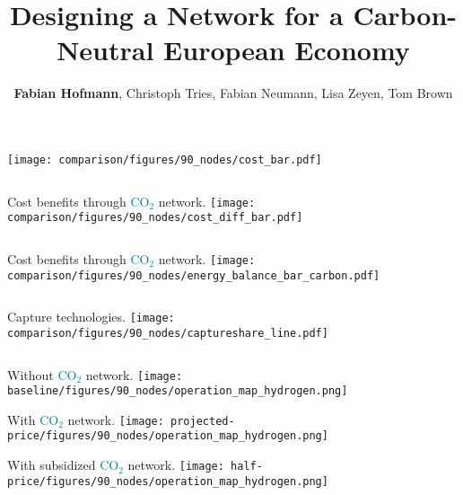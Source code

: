 \documentclass[12pt, aspectratio=169]{beamer}
\title{Designing a \carbon{} Network for a Carbon-Neutral European Economy}
\author{\textbf{Fabian Hofmann}, Christoph Tries, Fabian Neumann, Lisa Zeyen, Tom Brown}
\institute{Technical University Berlin}
\date{}
\newcommand{\carbon}{\textcolor{teal}{CO$_2$}}
\begin{document}
\begin{frame}[plain]
    \titlepage
\end{frame}


\begin{frame}
        \texttt{[image: comparison/figures/90\_nodes/cost\_bar.pdf]}
\end{frame}

\begin{frame}
    \begin{columns}
        Cost benefits through \carbon{} network.
        \texttt{[image: comparison/figures/90\_nodes/cost\_diff\_bar.pdf]}
    \end{columns}
\end{frame}


\begin{frame}
    \begin{columns}
        Cost benefits through \carbon{} network.
        \texttt{[image: comparison/figures/90\_nodes/energy\_balance\_bar\_carbon.pdf]}
    \end{columns}
\end{frame}


\begin{frame}
    \begin{columns}
        Capture technologies.
        \texttt{[image: comparison/figures/90\_nodes/captureshare\_line.pdf]}
    \end{columns}
\end{frame}


\begin{frame}
    \begin{center}
    Without \carbon{} network.
    \texttt{[image: baseline/figures/90\_nodes/operation\_map\_hydrogen.png]}
    \end{center}
\end{frame}


\begin{frame}
    \begin{center}
    With \carbon{} network.
    \texttt{[image: projected-price/figures/90\_nodes/operation\_map\_hydrogen.png]}
    \end{center}
\end{frame}

\begin{frame}
    \begin{center}
    With subsidized \carbon{} network.
    \texttt{[image: half-price/figures/90\_nodes/operation\_map\_hydrogen.png]}
    \end{center}
\end{frame}
\end{document}
